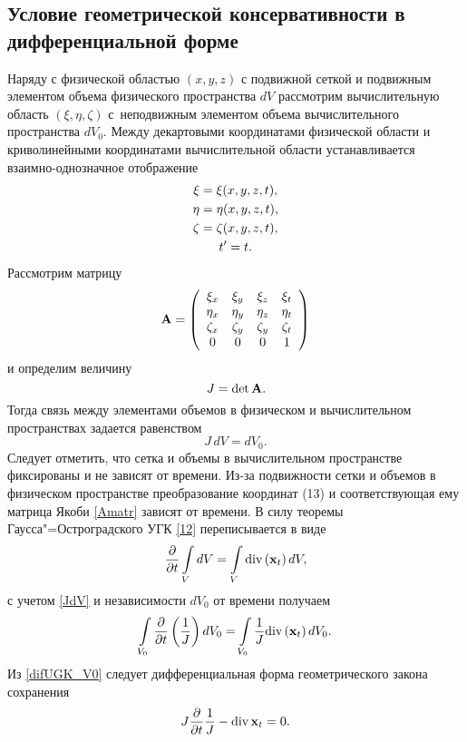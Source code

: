 \subsection{Условие геометрической консервативности в дифференциальной форме}
\label{s:114}
Наряду с физической областью $(x,y,z)$ с подвижной сеткой и подвижным элементом объема физического 
пространства $dV$ рассмотрим вычислительную область $(\xi,\eta,\zeta)$ с~неподвижным элементом объема 
вычислительного пространства $dV_0$. Между декартовыми координатами физической области и криволинейными
координатами вычислительной области устанавливается взаимно-однозначное отображение
\begin{gather}
  \label{xyzt}
  \xi=\xi(x,y,z,t),\notag \\
  \eta=\eta(x,y,z,t),\notag \\
  \zeta=\zeta(x,y,z,t),\notag \\
  t'=t.
\end{gather}
Рассмотрим матрицу
\begin{equation}
  \label{Amatr}
   {\bf{A}} = \left( {\begin{array}{*{20}c}
   {\xi _x } & {\xi _y } & {\xi _z } & {\xi _t } \\
   {\eta _x } & {\eta _y } & {\eta _z } & {\eta _t } \\
   {\zeta _x } & {\zeta _y } & {\zeta _y } & {\zeta _t } \\
   0 & 0 & 0 & 1 \\
   \end{array}} \right)
\end{equation}
и определим величину
\begin{equation}
  \label{JdetA}
  J=\text{det}\,{\bf{A}}.
\end{equation}
Тогда связь между элементами объемов в физическом и вычислительном пространствах задается равенством
\begin{equation}
  \label{JdV}
  J\,dV=dV_0.
\end{equation}
Следует отметить, что сетка и объемы в вычислительном пространстве фиксированы и не зависят от времени. 
Из-за подвижности сетки и объемов в физическом пространстве преобразование координат (13) и соответствующая 
ему матрица Якоби \eqref{Amatr} зависят от времени. В силу теоремы Гаусса"=Остроградского УГК
\eqref{12} переписывается в виде
\begin{equation}
  \label{difUGK} 
  \frac{\partial}{{\partial t}}\int\limits_V dV = \int\limits_V \text{div}\left({\bf{x}}_t\right) dV,
\end{equation}
с учетом \eqref{JdV} и независимости $dV_0$ от времени получаем
\begin{equation}
  \label{difUGK_V0} 
  \int\limits_{V_0}\frac{\partial }{{\partial t}}\left(\frac{1}{J}\right)dV_0 = \int\limits_{V_0}\frac{1}{J}
  \text{div}\left({\bf{x}}_t\right)dV_0.
\end{equation}
Из \eqref{difUGK_V0} следует дифференциальная форма геометрического закона сохранения
\begin{equation}
  \label{difUGK_1}
  J\frac{\partial }{{\partial t}}\frac{1}{J} - \text{div}\,{\bf{x}}_t  = 0.
\end{equation}

